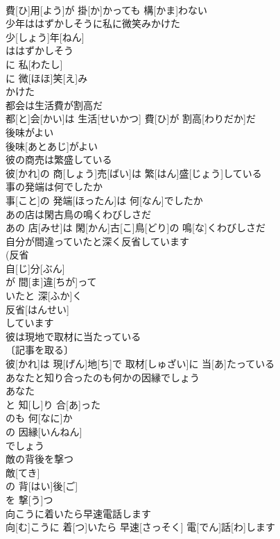 \documentclass[8pt]{extreport}
\begin{document}
\begin{CJK}{UTF8}{min}
\\	費[ひ]用[よう]が 掛[か]かっても 構[かま]わない
\\	少年ははずかしそうに私に微笑みかけた	
\\	少[しょう]年[ねん]
\\	ははずかしそう 
\\	に 私[わたし]
\\	に 微[ほほ]笑[え]み 
\\	かけた 
\\	都会は生活費が割高だ	
\\	都[と]会[かい]は 生活[せいかつ] 費[ひ]が 割高[わりだか]だ
\\	後味がよい	
\\	後味[あとあじ]がよい
\\	彼の商売は繁盛している	
\\	彼[かれ]の 商[しょう]売[ばい]は 繁[はん]盛[じょう]している
\\	事の発端は何でしたか	
\\	事[こと]の 発端[ほったん]は 何[なん]でしたか
\\	あの店は閑古鳥の鳴くわびしさだ	
\\	あの 店[みせ]は 閑[かん]古[こ]鳥[どり]の 鳴[な]くわびしさだ
\\	自分が間違っていたと深く反省しています	
\\	(反省 
\\	自[じ]分[ぶん]
\\	が 間[ま]違[ちが]って 
\\	いたと 深[ふか]く 
\\	反省[はんせい]
\\	しています
\\	彼は現地で取材に当たっている	
\\	〔記事を取る〕
\\	彼[かれ]は 現[げん]地[ち]で 取材[しゅざい]に 当[あ]たっている
\\	あなたと知り合ったのも何かの因縁でしょう	
\\	あなた 
\\	と 知[し]り 合[あ]った 
\\	のも 何[なに]か 
\\	の 因縁[いんねん]
\\	でしょう
\\	敵の背後を撃つ	
\\	敵[てき]
\\	の 背[はい]後[ご]
\\	を 撃[う]つ 
\\	向こうに着いたら早速電話します	
\\	向[む]こうに 着[つ]いたら 早速[さっそく] 電[でん]話[わ]します

\end{CJK}
\end{document}
